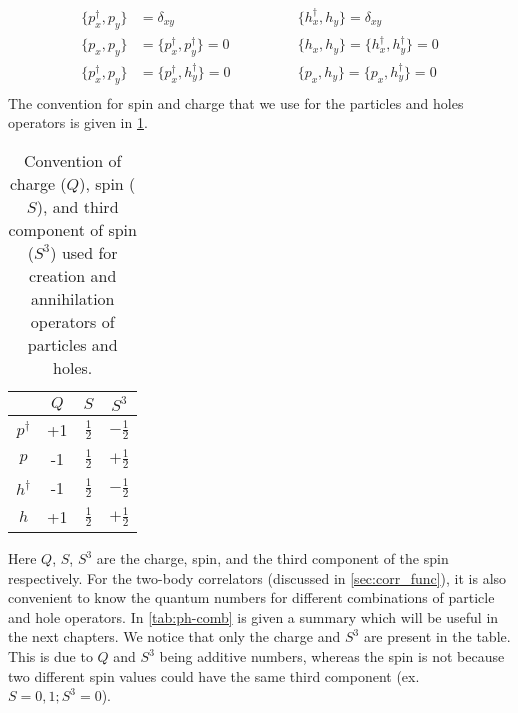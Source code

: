 \begin{equation}
    \begin{aligned}
        \{ p^\dagger_x, p_y \} &= \delta_{xy} &\{ h^\dagger_x, h_y \} = \delta_{xy}
        \\
        \{ p_x, p_y \} &= \{ p^\dagger_x, p^\dagger_y \} = 0 &\{ h_x, h_y \} = \{ h^\dagger_x, h^\dagger_y \} = 0
        \\
        \{ p^\dagger_x, p_y \} &= \{ p^\dagger_x, h^\dagger_y \} = 0 \qquad\qquad &\{ p_x, h_y \} = \{ p_x, h^\dagger_y \} = 0
        \\
    \end{aligned}
\end{equation}
The convention for spin and charge that we use for the particles and holes operators is given in \cref{tab:convention_operators}.
\begin{table}[h]
    \centering
    \begin{tabular}{c|ccc}
        & $Q$ & $S$ & $S^3$ \\
    \hline
        $p^\dagger$ & +1 & $\frac{1}{2}$ & $-\frac{1}{2}$ \\
        $p$ & -1 & $\frac{1}{2}$ & $+\frac{1}{2}$ \\
        $h^\dagger$ & -1 & $\frac{1}{2}$ & $-\frac{1}{2}$ \\
        $h$ & +1 & $\frac{1}{2}$ & $+\frac{1}{2}$ \\
    \end{tabular}
    \caption{Convention of charge ($Q$), spin ($S$), and third component of spin ($S^3$) used for creation and annihilation operators of particles and holes.}
    \label{tab:convention_operators}
\end{table}
Here $Q$, $S$, $S^3$ are the charge, spin, and the third component of the spin respectively. For the two-body correlators (discussed in \cref{sec:corr_func}), it is also convenient to know the quantum numbers for different combinations of particle and hole operators. In \cref{tab:ph-comb} is given a summary which will be useful in the next chapters. We notice that only the charge and $S^3$ are present in the table. This is due to $Q$ and $S^3$ being additive numbers, whereas the spin is not because two different spin values could have the same third component (ex. $S=0,1;S^3=0$).
